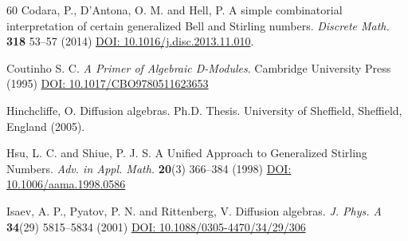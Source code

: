 \documentclass{amsart}
\theoremstyle{definition}
\theoremstyle{remark}
\numberwithin{equation}{section}
\begin{document}
\begin{thebibliography}{60}
 Codara, P., D'Antona, O. M. and Hell, P. A simple combinatorial interpretation of certain generalized Bell and Stirling numbers. {\em Discrete Math.} {\bf 318} 53--57 (2014) \href{https://doi.org/10.1016/j.disc.2013.11.010}{DOI: 10.1016/j.disc.2013.11.010}.


 Coutinho S. C. {\em A Primer of Algebraic D-Modules}. Cambridge University Press (1995) \href{https://doi.org/10.1017/CBO9780511623653}{DOI: 10.1017/CBO9780511623653}



 Hinchcliffe, O. Diffusion algebras. Ph.D. Thesis. University of Sheffield, Sheffield, England (2005).

 Hsu, L. C. and Shiue, P. J. S. A Unified Approach to Generalized Stirling Numbers. {\em Adv. in Appl. Math.} {\bf 20}(3) 366--384 (1998) \href{https://doi.org/10.1006/aama.1998.0586}{DOI: 10.1006/aama.1998.0586}

 Isaev, A. P., Pyatov, P. N. and Rittenberg, V. Diffusion algebras. {\em J. Phys. A} {\bf 34}(29) 5815--5834 (2001) \href{https://doi.org/10.1088/0305-4470/34/29/306}{DOI: 10.1088/0305-4470/34/29/306}




\end{thebibliography}
\end{document}
